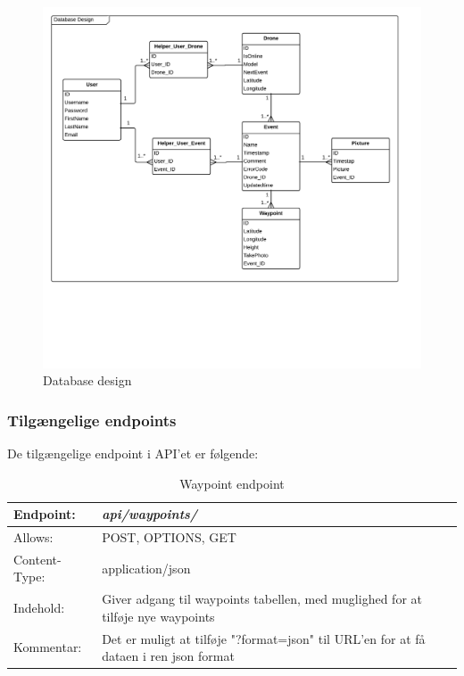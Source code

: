 \vspace{-5pt}
\begin{figure}[H]
	\centering
	\includegraphics[width=1\textwidth]{Billeder/database/database_design.png}
	\vspace{-5pt}
	\caption{Database design}
	\label{fig:database_design}
\end{figure}

\subsubsection{Tilgængelige endpoints}
De tilgængelige endpoint i API'et er følgende:

\begin{table}[H]
\begin{tabular}{| p{3cm}| p{11.5cm}|}
\hline
Endpoint:	 							& \textbf{\textit{api/waypoints/}}\\\hline
Allows:									& POST, OPTIONS, GET\\\hline
Content-Type:						& application/json\\\hline 
Indehold:								& Giver adgang til waypoints tabellen, med muglighed for at tilføje nye waypoints\\\hline 
Kommentar:							& Det er muligt at tilføje "?format=json" til URL'en for at få dataen i ren json format\\\hline
\end{tabular}
\caption{Waypoint endpoint}
\label{waypoint_endpoint}
\end{table}

